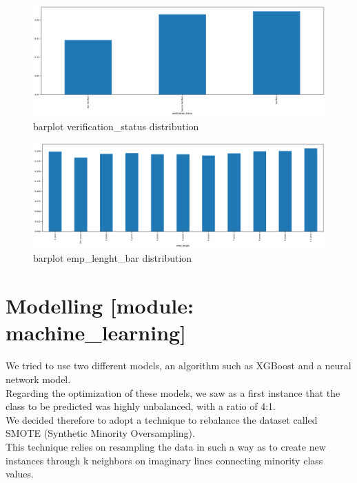 \documentclass[french]{scrartcl}
\begin{document}
	\begin{figure}[h!]
	\centering
	\includegraphics[scale=0.3]{figures/(3)verification_status_bar.pdf}
	\caption{barplot verification\_status distribution}
    \end{figure}
	\begin{figure}[h!]
	\centering
	\includegraphics[scale=0.3]{figures/(4)emp_lenght_bar.pdf}
	\caption{barplot emp\_lenght\_bar distribution}
    \end{figure}
\section{Modelling [module: machine\_learning]}
We tried to use two different models, an algorithm such as XGBoost and a neural network model.\\
Regarding the optimization of these models, we saw as a first instance that the class to be predicted was highly unbalanced, with a ratio of 4:1.\\
We decided therefore to adopt a technique to rebalance the dataset called SMOTE (Synthetic Minority Oversampling).\\
This technique relies on resampling the data in such a way as to create new instances through k neighbors on imaginary lines connecting minority class values.
\end{document}
